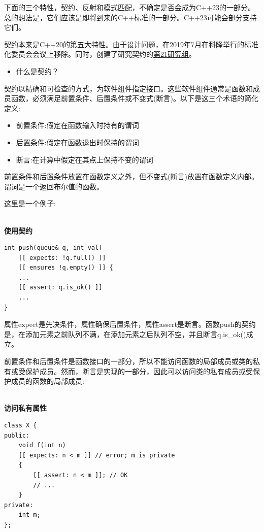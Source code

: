 
下面的三个特性，契约、反射和模式匹配，不确定是否会成为C++23的一部分。总的想法是，它们应该是即将到来的C++标准的一部分。C++23可能会部分支持它们。


契约本来是C++20的第五大特性。由于设计问题，在2019年7月在科隆举行的标准化委员会会议上移除。同时，创建了研究契约的\href{https://isocpp.org/std/the-committee}{第21研究组}。

\begin{itemize}
\item 
什么是契约？
\end{itemize}

契约以精确和可检查的方式，为软件组件指定接口。这些软件组件通常是函数和成员函数，必须满足前置条件、后置条件或不变式(断言)。以下是这三个术语的简化定义:

\begin{itemize}
\item 
前置条件:假定在函数输入时持有的谓词

\item 
后置条件:假定在函数退出时保持的谓词

\item 
断言:在计算中假定在其点上保持不变的谓词
\end{itemize}

前置条件和后置条件放置在函数定义之外，但不变式(断言)放置在函数定义内部。谓词是一个返回布尔值的函数。

这里是一个例子:

\hspace*{\fill} \\ %
\noindent
\textbf{使用契约}
\begin{lstlisting}[style=styleCXX]
int push(queue& q, int val)
	[[ expects: !q.full() ]]
	[[ ensures !q.empty() ]] {
	...
	[[ assert: q.is_ok() ]]
	...
}
\end{lstlisting}

属性expect是先决条件，属性确保后置条件，属性assert是断言。函数push的契约是，在添加元素之前队列不满，在添加元素之后队列不空，并且断言q.is\_ok()成立。

前置条件和后置条件是函数接口的一部分，所以不能访问函数的局部成员或类的私有或受保护成员。然而，断言是实现的一部分，因此可以访问类的私有成员或受保护成员的函数的局部成员:

\hspace*{\fill} \\ %
\noindent
\textbf{访问私有属性}
\begin{lstlisting}[style=styleCXX]
class X {
public:
	void f(int n)
	[[ expects: n < m ]] // error; m is private
	{
		[[ assert: n < m ]]; // OK
		// ...
	}
private:
	int m;
};
\end{lstlisting}

